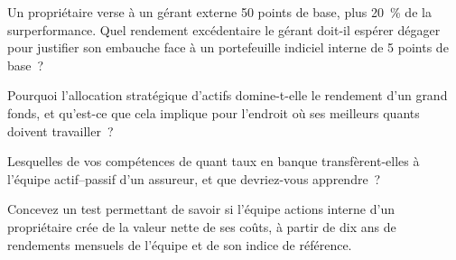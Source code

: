 \begin{interviewq}\label{iq:in:asset-managers-pensions-sovereign-funds-and-insurers:3}
Un propriétaire verse à un gérant externe 50 points de base, plus 20~\% de la surperformance. Quel rendement excédentaire le gérant doit-il
espérer dégager pour justifier son embauche face à un portefeuille indiciel interne de 5 points de base~?
\end{interviewq}

\begin{interviewq}\label{iq:in:asset-managers-pensions-sovereign-funds-and-insurers:4}
Pourquoi l'allocation stratégique d'actifs domine-t-elle le rendement d'un grand fonds, et qu'est-ce que cela implique
pour l'endroit où ses meilleurs quants doivent travailler~?
\end{interviewq}

\begin{interviewq}\label{iq:in:asset-managers-pensions-sovereign-funds-and-insurers:5}
Lesquelles de vos compétences de quant taux en banque transfèrent-elles à l'équipe actif--passif d'un assureur, et que devriez-vous
apprendre~?
\end{interviewq}

\begin{interviewq}\label{iq:in:asset-managers-pensions-sovereign-funds-and-insurers:6}
Concevez un test permettant de savoir si l'équipe actions interne d'un propriétaire crée de la valeur nette de ses coûts, à partir de dix ans de rendements mensuels
de l'équipe et de son indice de référence.
\end{interviewq}

